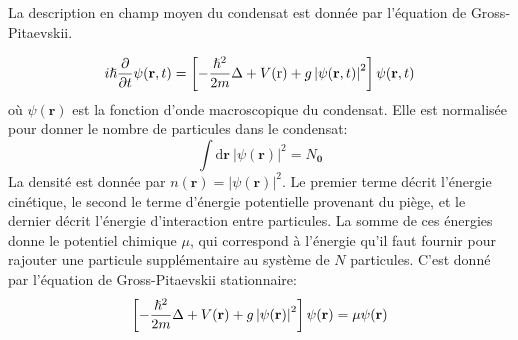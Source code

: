 La description en champ moyen du condensat est donnée par l'équation de Gross-Pitaevskii.

\begin{equation}
i\hslash \frac{\partial}{\partial t} \psi(\mathbf{r},t)=\left[-\frac{\hslash^2}{2m}\Delta +V(\mathrm{r})+g\left| \psi(\mathbf{r},t) \right|^2 \right] \psi(\mathbf{r},t)
\end{equation}
où $\psi(\mathbf{r})$ est la fonction d'onde macroscopique du condensat. Elle est normalisée pour donner le nombre de particules dans le condensat:
\begin{equation}
\int{\mathrm{d}\mathbf{r} \: \left| \psi(\mathbf{r}) \right|^2}=N_{\mathbf{0}}
\end{equation}
La densité est donnée par $n(\mathbf{r})= \left| \psi(\mathbf{r}) \right|^2$. 
Le premier terme décrit l'énergie cinétique, le second le terme d'énergie potentielle provenant du piège, et le dernier décrit l'énergie d'interaction entre particules. La somme de ces énergies donne le potentiel chimique $\mu$, qui correspond à l'énergie qu'il faut fournir pour rajouter une particule supplémentaire au système de $N$ particules. C'est donné par l'équation de Gross-Pitaevskii stationnaire:
\begin{equation}
\left[ -\frac{\hslash^2}{2m}\Delta + V(\mathbf{r}) + g\left|\psi(\mathbf{r})\right|^2 \right] \psi(\mathbf{r}) = \mu \psi(\mathbf{r})
\end{equation}

